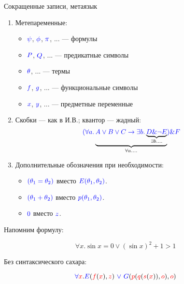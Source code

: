 Сокращенные записи, метаязык
\begin{enumerate}
    \item Метепаременные:
    \begin{itemize}
        \item $\color{blue}\psi$, $\color{blue}\phi$, $\color{blue}\pi$, ... --- формулы
        \item $\color{blue}P$, $\color{blue}Q$, ... --- предикатные символы
        \item $\color{blue}\theta$, ... --- термы
        \item $\color{blue}f$, $\color{blue}g$, ... --- функциональные символы
        \item $\color{blue}x$, $\color{blue}y$, ... --- предметные переменные
        \end{itemize}

    \item Скобки --- как в И.В.; квантор --- жадный:
    \[ {\color{blue}(\forall a.} \underbrace{{\color{blue}A \vee B \vee C \rightarrow \exists b.}
                        \underbrace{\color{blue}D \& \neg E}_{\exists b.\dots}}_{\forall a.\dots} \color{blue}) \& F \]

    \item Дополнительные обозначения при необходимости:
    \begin{itemize}
        \item ${\color{blue} (\theta_1 = \theta_2)} $ вместо ${\color{blue} E(\theta_1, \theta_2)}$.
        \item ${\color{blue} (\theta_1 + \theta_2)} $ вместо ${\color{blue} p(\theta_1, \theta_2)}$.
        \item ${\color{blue} 0} $ вместо ${\color{blue} z}$.
    \end{itemize}
\end{enumerate}

Напомним формулу:\vspace{-0.3cm}

$$\forall x.\sin x = 0 \vee (\sin x)^2+1 > 1$$

Без синтаксического сахара:\vspace{-0.3cm}

\[ {\color{blue}\forall} {\color{red}x}.{\color{blue}E}({\color{red}f} ({\color{red}x}),{\color{red}z}) {\color{blue}~\vee~} {\color{blue}G}
   ({\color{red}p}({\color{red}q}({\color{red}s} ({\color{red}x})),{\color{red}o}), {\color{red}o}) \]


